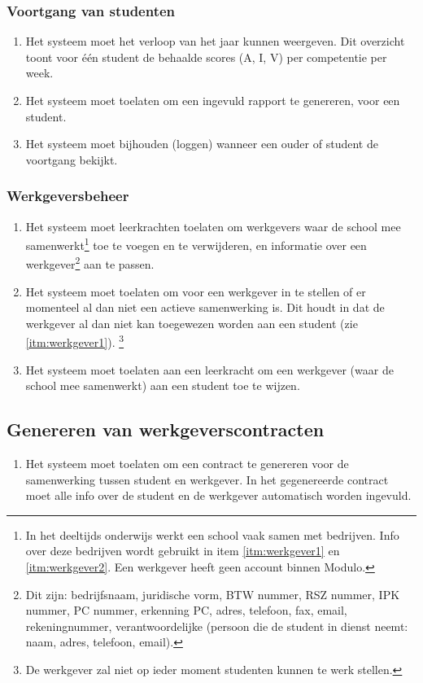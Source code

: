 \documentclass[a4paper]{article}
\begin{document}
\subsubsection{Voortgang van studenten}
\begin{enumerate}[label=F\arabic*,resume]
\item Het systeem moet het verloop van het jaar kunnen weergeven. Dit overzicht toont voor één student de behaalde scores (A, I, V) per competentie per week.
\item Het systeem moet toelaten om een ingevuld rapport te genereren, voor een student.
\item Het systeem moet bijhouden (loggen) wanneer een ouder of student de voortgang bekijkt.
\end{enumerate}

\subsubsection{Werkgeversbeheer}
\begin{enumerate}[label=F\arabic*,resume]
\item \label{itm:werkgever_info} Het systeem moet leerkrachten toelaten om werkgevers waar de school mee samenwerkt\footnote{In het deeltijds onderwijs werkt een school vaak samen met bedrijven. Info over deze bedrijven wordt gebruikt in item \ref{itm:werkgever1} en \ref{itm:werkgever2}. Een werkgever heeft geen account binnen Modulo.} toe te voegen en te verwijderen, en informatie over een werkgever\footnote{Dit zijn: bedrijfsnaam, juridische vorm, BTW nummer, RSZ nummer, IPK nummer, PC nummer, erkenning PC, adres, telefoon, fax, email, rekeningnummer, verantwoordelijke (persoon die de student in dienst neemt: naam, adres, telefoon, email).} aan te passen.
\item Het systeem moet toelaten om voor een werkgever in te stellen of er momenteel al dan niet een actieve samenwerking is. Dit houdt in dat de werkgever al dan niet kan toegewezen worden aan een student (zie \ref{itm:werkgever1}). \footnote{De werkgever zal niet op ieder moment studenten kunnen te werk stellen.}
\item \label{itm:werkgever1} Het systeem moet toelaten aan een leerkracht om een werkgever (waar de school mee samenwerkt) aan een student toe te wijzen.
\end{enumerate}

\subsection{Genereren van werkgeverscontracten}
\begin{enumerate}[label=F\arabic*,resume]
\item \label{itm:werkgever2} Het systeem moet toelaten om een contract te genereren voor de samenwerking tussen student en werkgever. In het gegenereerde contract moet alle info over de student en de werkgever automatisch worden ingevuld.
\end{enumerate}
\end{document}
